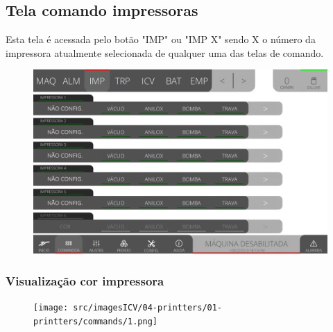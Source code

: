 \thispagestyle{fancy}
\vspace*{40 pt}
\subsection{Tela comando impressoras} \label{sec:telaComandoImpressoras}
Esta tela é acessada pelo botão "IMP" ou "IMP X" sendo X o número da impressora atualmente selecionada de qualquer uma das telas de comando.
\vspace*{\fill}
\begin{figure}[h]
    \centering
    \includegraphics[width=480 px,height=300 px]{src/imagesICV/04-printters/01-printters/commands/e-Tela-Principal.png}
\end{figure}
\vspace*{\fill}

\newpage
\thispagestyle{fancy}
\vspace*{40 pt}
\subsubsection{Visualização cor impressora} \label{sec:telaComandoImpressorasVisualizacaoCorImpressora}
\vspace*{\fill}
\begin{figure}[h]
    \centering
    \texttt{[image: src/imagesICV/04-printters/01-printters/commands/1.png]}
\end{figure}
\vspace*{\fill}

\newpage
\thispagestyle{fancy}
\vspace*{40 pt}
